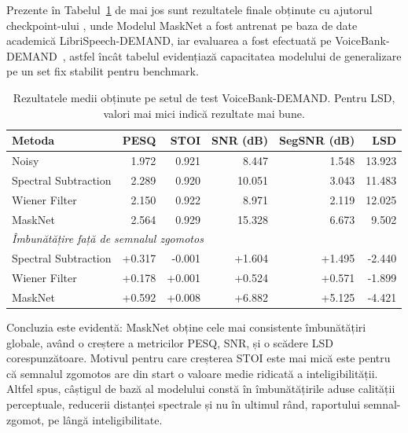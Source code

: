 \documentclass[12pt,a4paper]{report}
\begin{document}
Prezente în Tabelul~\ref{tab:rezultate_evaluare_finala} de mai jos sunt rezultatele finale obținute 
cu ajutorul checkpoint-ului , 
unde Modelul MaskNet a fost antrenat pe baza de date academică LibriSpeech-DEMAND, 
iar evaluarea a fost efectuată pe VoiceBank-DEMAND~\cite{librispeech,demand,voicebank_demand}, astfel încât 
tabelul evidențiază capacitatea modelului de generalizare pe un set 
fix stabilit pentru benchmark.


\begin{table}[htbp]
\centering
\caption{Rezultatele medii obținute pe setul de test VoiceBank-DEMAND. Pentru LSD, valori mai mici indică rezultate mai bune.
}
\label{tab:rezultate_evaluare_finala}
\vspace{0.75em}
\begin{tabular}{lrrrrr}
\toprule
Metoda & PESQ & STOI & SNR (dB) & SegSNR (dB) & LSD \\
\midrule
Noisy & 1.972 & 0.921 & 8.447 & 1.548 & 13.923 \\
Spectral Subtraction & 2.289 & 0.920 & 10.051 & 3.043 & 11.483 \\
Wiener Filter & 2.150 & 0.922 & 8.971 & 2.119 & 12.025 \\
MaskNet & 2.564 & 0.929 & 15.328 & 6.673 & 9.502 \\
\midrule
\multicolumn{6}{l}{\textit{Îmbunătățire față de semnalul zgomotos}} \\
Spectral Subtraction & +0.317 & -0.001 & +1.604 & +1.495 & -2.440 \\
Wiener Filter & +0.178 & +0.001 & +0.524 & +0.571 & -1.899 \\
MaskNet & +0.592 & +0.008 & +6.882 & +5.125 & -4.421 \\
\bottomrule
\end{tabular}

\end{table}


\newpage

Concluzia este evidentă: MaskNet obține cele mai consistente îmbunătățiri 
globale, având o creștere a metricilor PESQ, SNR, și o scădere LSD corespunzătoare. 
Motivul pentru care creșterea STOI este mai mică este pentru că 
semnalul zgomotos are din start o valoare medie ridicată a inteligibilității. 
Altfel spus, câștigul de bază al modelului constă în îmbunătățirile 
aduse calității perceptuale, reducerii distanței spectrale și nu în 
ultimul rând, raportului semnal-zgomot, pe lângă inteligibilitate.
\end{document}
